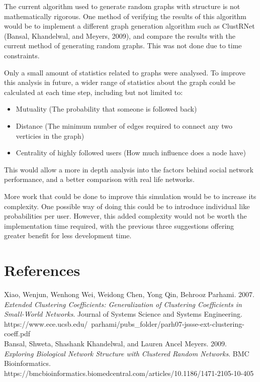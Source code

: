 \documentclass{article}
\begin{document}
The current algorithm used to generate random graphs with structure is not mathematically rigorous.
One method of verifying the results of this algorithm would be to implement a different
graph generation algorithm such as ClustRNet (Bansal, Khandelwal, and Meyers, 2009),
and compare the results with the current method of generating random graphs.
This was not done due to time constraints.

Only a small amount of statistics related to graphs were analysed. To improve this
analysis in future, a wider range of statistics about the graph could be calculated at each time step,
including but not limited to:
\begin{itemize}
\item Mutuality (The probability that someone is followed back)
\item Distance (The minimum number of edges required to connect any two verticies in the graph)
\item Centrality of highly followed users (How much influence does a node have)
\end{itemize}
This would allow a more in depth analysis into the factors behind social network performance, and a better
comparison with real life networks.

More work that could be done to improve this simulation would be to increase
its complexity. One possible way of doing this could be to introduce
individual like probabilities per user. However,
this added complexity would not be worth the implementation time required,
with the previous three suggestions offering greater benefit for less development
time.

\section{References}
Xiao, Wenjun, Wenhong Wei, Weidong Chen, Yong Qin, Behrooz Parhami. 2007.
\textit{Extended Clustering Coefficients: Generalization of Clustering Coefficients in Small-World
Networks}. Journal of Systems Science and Systems Engineering. https://www.ece.ucsb.edu/~parhami/pubs\_folder/parh07-jssse-ext-clustering-coeff.pdf\\

Bansal, Shweta, Shashank Khandelwal, and Lauren Ancel Meyers. 2009. \textit{Exploring Biological Network Structure with Clustered Random Networks}.
BMC Bioinformatics. https://bmcbioinformatics.biomedcentral.com/articles/10.1186/1471-2105-10-405
\end{document}
